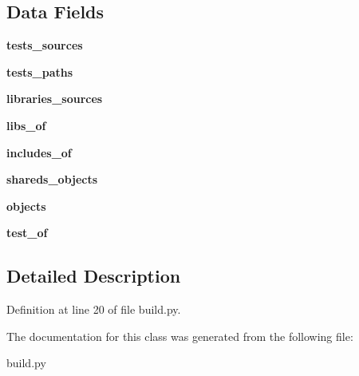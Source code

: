\subsection*{\-Data \-Fields}
\begin{DoxyCompactItemize}
\item 
\hypertarget{classbuild_1_1InputPlugins_a8369fde13604b036acddc44709b14c5b}{{\bfseries tests\-\_\-sources}}\label{classbuild_1_1InputPlugins_a8369fde13604b036acddc44709b14c5b}

\item 
\hypertarget{classbuild_1_1InputPlugins_a2d932f4fb1790b42b90d213428072e71}{{\bfseries tests\-\_\-paths}}\label{classbuild_1_1InputPlugins_a2d932f4fb1790b42b90d213428072e71}

\item 
\hypertarget{classbuild_1_1InputPlugins_ab4434d33f230cabd0225e32a4b7140e2}{{\bfseries libraries\-\_\-sources}}\label{classbuild_1_1InputPlugins_ab4434d33f230cabd0225e32a4b7140e2}

\item 
\hypertarget{classbuild_1_1InputPlugins_a7441b4969f45a5589d7516237fdf3e89}{{\bfseries libs\-\_\-of}}\label{classbuild_1_1InputPlugins_a7441b4969f45a5589d7516237fdf3e89}

\item 
\hypertarget{classbuild_1_1InputPlugins_aaf27f280f19ba39aaa22d6f4201d2614}{{\bfseries includes\-\_\-of}}\label{classbuild_1_1InputPlugins_aaf27f280f19ba39aaa22d6f4201d2614}

\item 
\hypertarget{classbuild_1_1InputPlugins_a2deef051b57ce38320ef2b5455b1b3a4}{{\bfseries shareds\-\_\-objects}}\label{classbuild_1_1InputPlugins_a2deef051b57ce38320ef2b5455b1b3a4}

\item 
\hypertarget{classbuild_1_1InputPlugins_ac1fce4852aafa244b7ca381be642b53d}{{\bfseries objects}}\label{classbuild_1_1InputPlugins_ac1fce4852aafa244b7ca381be642b53d}

\item 
\hypertarget{classbuild_1_1InputPlugins_a0f27efdc313720e58303ff1bd5161e01}{{\bfseries test\-\_\-of}}\label{classbuild_1_1InputPlugins_a0f27efdc313720e58303ff1bd5161e01}

\end{DoxyCompactItemize}


\subsection{\-Detailed \-Description}


\-Definition at line 20 of file build.\-py.



\-The documentation for this class was generated from the following file\-:\begin{DoxyCompactItemize}
\item 
build.\-py\end{DoxyCompactItemize}
